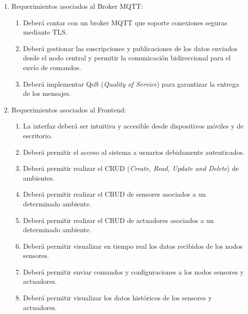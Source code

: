 \documentclass[
11pt, %
codirector, %
]{charter}
\begin{document}
\begin{enumerate}

	\item Requerimientos asociados al Broker MQTT:
	      \begin{enumerate}
		      \item Deberá contar con un broker MQTT que soporte conexiones seguras mediante TLS.
		      \item Deberá gestionar las suscripciones y publicaciones de los datos enviados desde el nodo central
		            y permitir la comunicación bidireccional para el envío de comandos.
		      \item Deberá implementar QoS (\textit{Quality of  Service}) para garantizar la entrega de los mensajes.
	      \end{enumerate}

	\item Requerimientos asociados al Frontend:
	      \begin{enumerate}
		      \item La interfaz deberá ser intuitiva y accesible desde dispositivos móviles y de escritorio.
		      \item Deberá permitir el acceso al sistema a usuarios debidamente autenticados.
		      \item Deberá permitir realizar el CRUD (\textit{Create, Read, Update and Delete}) de ambientes.
		      \item Deberá permitir realizar el CRUD de sensores asociados a un determinado ambiente.
		      \item Deberá permitir realizar el CRUD de actuadores asociados a un determinado ambiente.
		      \item Deberá permitir visualizar en tiempo real los datos recibidos de los nodos sensores.
		      \item Deberá permitir enviar comandos y configuraciones a los nodos sensores y actuadores.
		      \item Deberá permitir visualizar los datos históricos de los sensores y actuadores.
	      \end{enumerate}


\end{enumerate}
\end{document}
